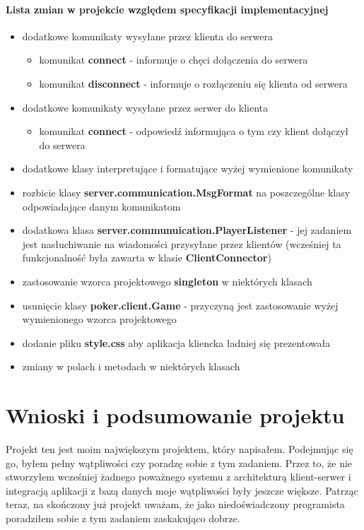 \documentclass{article}
\begin{document}
    \paragraph{Lista zmian w projekcie względem specyfikacji implementacyjnej}
    \begin{itemize}
        \item dodatkowe komunikaty wysyłane przez klienta do serwera
        \begin{itemize}
            \item komunikat \textbf{connect} - informuje o chęci dołączenia do serwera
            \item komunikat \textbf{disconnect} - informuje o rozłączeniu się klienta od serwera
        \end{itemize}
        \item dodatkowe komunikaty wysyłane przez serwer do klienta
        \begin{itemize}
            \item komunikat \textbf{connect} - odpowiedź informująca o tym czy klient dołączył do serwera
        \end{itemize}
        \item dodatkowe klasy interpretujące i formatujące wyżej wymienione komunikaty
        \item rozbicie klasy \textbf{server.communication.MsgFormat} na poszczególne klasy odpowiadające danym komunikatom
        \item dodatkowa klasa \textbf{server.communuication.PlayerListener} - jej zadaniem jest nasłuchiwanie na wiadomości przysyłane przez klientów (wcześniej ta funkcjonalność była zawarta w klasie \textbf{ClientConnector})
        \item zastosowanie wzorca projektowego \textbf{singleton} w niektórych klasach
        \item usunięcie klasy \textbf{poker.client.Game} - przyczyną jest zastosowanie wyżej wymienionego wzorca projektowego
        \item dodanie pliku \textbf{style.css} aby aplikacja kliencka ładniej się prezentowała
        \item zmiany w polach i metodach w niektórych klasach
    \end{itemize}


\section{Wnioski i podsumowanie projektu}
    Projekt ten jest moim największym projektem, który napisałem.
    Podejmując się go, byłem pełny wątpliwości czy poradzę sobie z tym zadaniem.
    Przez to, że nie stworzyłem wcześniej żadnego poważnego systemu z architekturą klient-serwer i integracją aplikacji z bazą danych moje wątpliwości były jeszcze większe.
    Patrząc teraz, na skończony już projekt uważam, że jako niedoświadczony programista poradziłem sobie z tym zadaniem zaskakująco dobrze.
    
\end{document}
